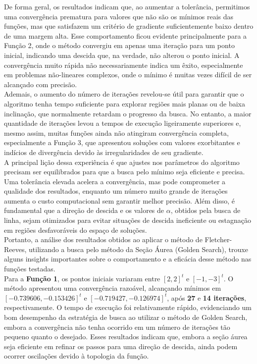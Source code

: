 \documentclass[a4paper, 12pt]{article}
\begin{document}
De forma geral, os resultados indicam que, ao aumentar a tolerância, permitimos uma convergência prematura para valores que não são os mínimos reais das funções, mas que satisfazem um critério de gradiente suficientemente baixo dentro de uma margem alta. Esse comportamento ficou evidente principalmente para a Função 2, onde o método convergiu em apenas uma iteração para um ponto inicial, indicando uma descida que, na verdade, não alterou o ponto inicial. A convergência muito rápida não necessariamente indica um êxito, especialmente em problemas não-lineares complexos, onde o mínimo é muitas vezes difícil de ser alcançado com precisão.\\

Ademais, o aumento do número de iterações revelou-se útil para garantir que o algoritmo tenha tempo suficiente para explorar regiões mais planas ou de baixa inclinação, que normalmente retardam o progresso da busca. No entanto, a maior quantidade de iterações levou a tempos de execução ligeiramente superiores e, mesmo assim, muitas funções ainda não atingiram convergência completa, especialmente a Função 3, que apresentou soluções com valores exorbitantes e indícios de divergência devido às irregularidades de seu gradiente.\\

A principal lição dessa experiência é que ajustes nos parâmetros do algoritmo precisam ser equilibrados para que a busca pelo mínimo seja eficiente e precisa. Uma tolerância elevada acelera a convergência, mas pode comprometer a qualidade dos resultados, enquanto um número muito grande de iterações aumenta o custo computacional sem garantir melhor precisão. Além disso, é fundamental que a direção de descida e os valores de $\alpha$, obtidos pela busca de linha, sejam otimizados para evitar situações de descida ineficiente ou estagnação em regiões desfavoráveis do espaço de soluções.\\

Portanto, a análise dos resultados obtidos ao aplicar o método de Fletcher-Reeves, utilizando a busca pelo método da Seção Áurea (Golden Search), trouxe alguns insights importantes sobre o comportamento e a eficácia desse método nas funções testadas.\\

Para a \textbf{Função 1}, os pontos iniciais variaram entre \([2, 2]^t\) e \([-1, -3]^t\). O método apresentou uma convergência razoável, alcançando mínimos em \([-0.739606, -0.153426]^t\) e \([-0.719427, -0.126974]^t\), após \textbf{27} e \textbf{14 iterações}, respectivamente. O tempo de execução foi relativamente rápido, evidenciando um bom desempenho da estratégia de busca ao utilizar o método de Golden Search, embora a convergência não tenha ocorrido em um número de iterações tão pequeno quanto o desejado. Esses resultados indicam que, embora a seção áurea seja eficiente em refinar os passos para uma direção de descida, ainda podem ocorrer oscilações devido à topologia da função.\\
\end{document}

